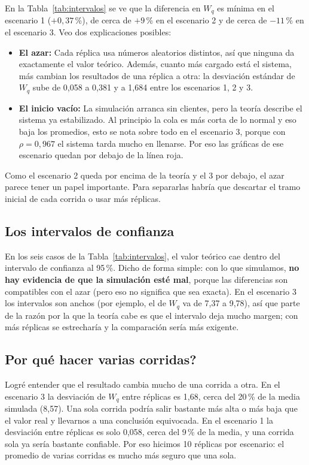 \documentclass[11pt,a4paper]{article}
\begin{document}
En la Tabla~\ref{tab:intervalos} se ve que la diferencia en $W_q$ es mínima en el escenario 1 ($+0{,}37$\,\%), de cerca de $+9$\,\% en el escenario 2 y de cerca de $-11$\,\% en el escenario 3. Veo dos explicaciones posibles:

\begin{itemize}
    \item \textbf{El azar:} Cada réplica usa números aleatorios distintos, así que ninguna da exactamente el valor teórico. Además, cuanto más cargado está el sistema, más cambian los resultados de una réplica a otra: la desviación estándar de $W_q$ sube de 0,058 a 0,381 y a 1,684 entre los escenarios 1, 2 y 3.
    \item \textbf{El inicio vacío:} La simulación arranca sin clientes, pero la teoría describe el sistema ya estabilizado. Al principio la cola es más corta de lo normal y eso baja los promedios, esto se nota sobre todo en el escenario 3, porque con $\rho = 0{,}967$ el sistema tarda mucho en llenarse. Por eso las gráficas de ese escenario quedan por debajo de la línea roja.
\end{itemize}

Como el escenario 2 queda por encima de la teoría y el 3 por debajo, el azar parece tener un papel importante. Para separarlas habría que descartar el tramo inicial de cada corrida o usar más réplicas.

\subsection{Los intervalos de confianza}

En los seis casos de la Tabla~\ref{tab:intervalos}, el valor teórico cae dentro del intervalo de confianza al 95\,\%. Dicho de forma simple: con lo que simulamos, \textbf{no hay evidencia de que la simulación esté mal}, porque las diferencias son compatibles con el azar (pero eso no significa que sea exacta). En el escenario 3 los intervalos son anchos (por ejemplo, el de $W_q$ va de 7,37 a 9,78), así que parte de la razón por la que la teoría cabe es que el intervalo deja mucho margen; con más réplicas se estrecharía y la comparación sería más exigente.

\subsection{\textquestiondown{}Por qué hacer varias corridas?}

Logré entender que el resultado cambia mucho de una corrida a otra. En el escenario 3 la desviación de $W_q$ entre réplicas es 1,68, cerca del 20\,\% de la media simulada (8,57). Una sola corrida podría salir bastante más alta o más baja que el valor real y llevarnos a una conclusión equivocada. En el escenario 1 la desviación entre réplicas es solo 0,058, cerca del 9\,\% de la media, y una corrida sola ya sería bastante confiable. Por eso hicimos 10 réplicas por escenario: el promedio de varias corridas es mucho más seguro que una sola.
\end{document}
